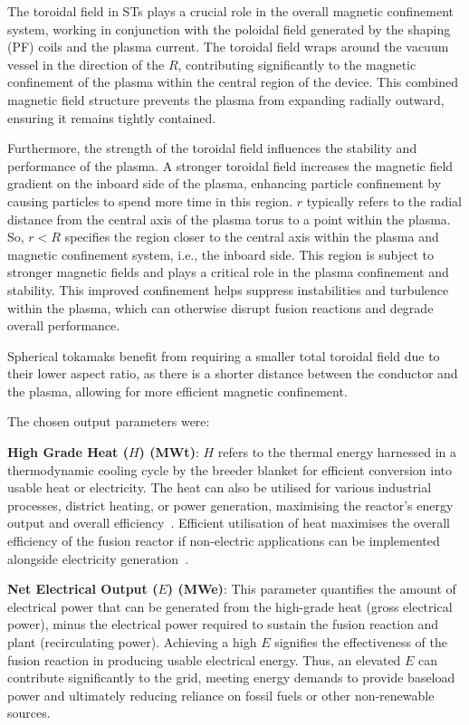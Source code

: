 \documentclass[journal]{IEEEtran}
\begin{document}
The toroidal field in STs plays a crucial role in the overall magnetic confinement system, working in conjunction with the poloidal field generated by the shaping (PF) coils and the plasma current. The toroidal field wraps around the vacuum vessel in the direction of the $R$, contributing significantly to the magnetic confinement of the plasma within the central region of the device. This combined magnetic field structure prevents the plasma from expanding radially outward, ensuring it remains tightly contained.

Furthermore, the strength of the toroidal field influences the stability and performance of the plasma. A stronger toroidal field increases the magnetic field gradient on the inboard side of the plasma, enhancing particle confinement by causing particles to spend more time in this region. \( r \) typically refers to the radial distance from the central axis of the plasma torus to a point within the plasma. So, \( r < R \) specifies the region closer to the central axis within the plasma and magnetic confinement system, i.e., the inboard side. This region is subject to stronger magnetic fields and plays a critical role in the plasma confinement and stability. This improved confinement helps suppress instabilities and turbulence within the plasma, which can otherwise disrupt fusion reactions and degrade overall performance.

Spherical tokamaks benefit from requiring a smaller total toroidal field due to their lower aspect ratio, as there is a shorter distance between the conductor and the plasma, allowing for more efficient magnetic confinement.

The chosen output parameters were:

\textbf{High Grade Heat ($H$) (MWt)}: $H$ refers to the thermal energy harnessed in a thermodynamic cooling cycle by the breeder blanket for efficient conversion into usable heat or electricity. The heat can also be utilised for various industrial processes, district heating, or power generation, maximising the reactor's energy output and overall efficiency~\cite{Griffiths2022}. Efficient utilisation of heat maximises the overall efficiency of the fusion reactor if non-electric applications can be implemented alongside electricity generation~\cite{Hidalgo-Salaverri2023}.

\textbf{Net Electrical Output ($E$) (MWe)}: This parameter quantifies the amount of electrical power that can be generated from the high-grade heat (gross electrical power), minus the electrical power required to sustain the fusion reaction and plant (recirculating power). Achieving a high $E$ signifies the effectiveness of the fusion reaction in producing usable electrical energy. Thus, an elevated $E$ can contribute significantly to the grid, meeting energy demands to provide baseload power and ultimately reducing reliance on fossil fuels or other non-renewable sources. 
\end{document}
